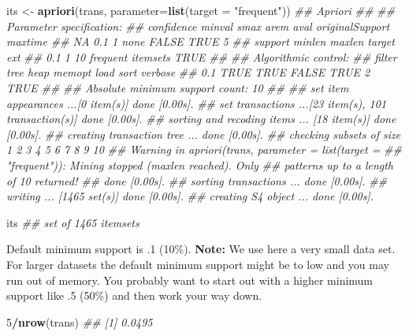 \documentclass[
  notitlepage]{book}
\newenvironment{Shaded}{\begin{snugshade}}{\end{snugshade}}
\newcommand{\CommentTok}[1]{\textcolor[rgb]{0.56,0.35,0.01}{\textit{#1}}}
\newcommand{\DataTypeTok}[1]{\textcolor[rgb]{0.13,0.29,0.53}{#1}}
\newcommand{\DecValTok}[1]{\textcolor[rgb]{0.00,0.00,0.81}{#1}}
\newcommand{\KeywordTok}[1]{\textcolor[rgb]{0.13,0.29,0.53}{\textbf{#1}}}
\newcommand{\NormalTok}[1]{#1}
\newcommand{\OperatorTok}[1]{\textcolor[rgb]{0.81,0.36,0.00}{\textbf{#1}}}
\newcommand{\StringTok}[1]{\textcolor[rgb]{0.31,0.60,0.02}{#1}}
\begin{document}
\begin{Shaded}
\begin{Highlighting}[]
\NormalTok{its \textless{}{-}}\StringTok{ }\KeywordTok{apriori}\NormalTok{(trans, }\DataTypeTok{parameter=}\KeywordTok{list}\NormalTok{(}\DataTypeTok{target =} \StringTok{"frequent"}\NormalTok{))}
\CommentTok{\#\# Apriori}
\CommentTok{\#\# }
\CommentTok{\#\# Parameter specification:}
\CommentTok{\#\#  confidence minval smax arem  aval originalSupport maxtime}
\CommentTok{\#\#          NA    0.1    1 none FALSE            TRUE       5}
\CommentTok{\#\#  support minlen maxlen            target  ext}
\CommentTok{\#\#      0.1      1     10 frequent itemsets TRUE}
\CommentTok{\#\# }
\CommentTok{\#\# Algorithmic control:}
\CommentTok{\#\#  filter tree heap memopt load sort verbose}
\CommentTok{\#\#     0.1 TRUE TRUE  FALSE TRUE    2    TRUE}
\CommentTok{\#\# }
\CommentTok{\#\# Absolute minimum support count: 10 }
\CommentTok{\#\# }
\CommentTok{\#\# set item appearances ...[0 item(s)] done [0.00s].}
\CommentTok{\#\# set transactions ...[23 item(s), 101 transaction(s)] done [0.00s].}
\CommentTok{\#\# sorting and recoding items ... [18 item(s)] done [0.00s].}
\CommentTok{\#\# creating transaction tree ... done [0.00s].}
\CommentTok{\#\# checking subsets of size 1 2 3 4 5 6 7 8 9 10}
\CommentTok{\#\# Warning in apriori(trans, parameter = list(target =}
\CommentTok{\#\# "frequent")): Mining stopped (maxlen reached). Only}
\CommentTok{\#\# patterns up to a length of 10 returned!}
\CommentTok{\#\#  done [0.00s].}
\CommentTok{\#\# sorting transactions ... done [0.00s].}
\CommentTok{\#\# writing ... [1465 set(s)] done [0.00s].}
\CommentTok{\#\# creating S4 object  ... done [0.00s].}
\end{Highlighting}
\end{Shaded}

\begin{Shaded}
\begin{Highlighting}[]
\NormalTok{its}
\CommentTok{\#\# set of 1465 itemsets}
\end{Highlighting}
\end{Shaded}

Default minimum support is .1 (10\%). \textbf{Note:} We use here a very small
data set. For larger datasets the default minimum support might be to
low and you may run out of memory. You probably want to start out with a
higher minimum support like .5 (50\%) and then work your way down.

\begin{Shaded}
\begin{Highlighting}[]
\DecValTok{5}\OperatorTok{/}\KeywordTok{nrow}\NormalTok{(trans)}
\CommentTok{\#\# [1] 0.0495}
\end{Highlighting}
\end{Shaded}
\end{document}
